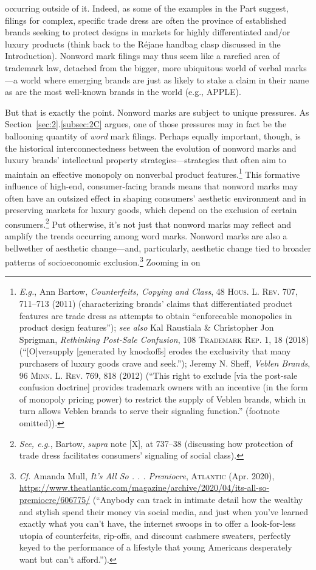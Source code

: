 \documentclass[letterpaper, 11pt, oneside]{article}
\begin{document}
occurring outside of it. Indeed, as some of the examples in the Part suggest, filings for complex, specific trade dress are often the province of established brands seeking to protect designs in markets for highly differentiated and/or luxury products (think back to the Réjane handbag clasp discussed in the Introduction). Nonword mark filings may thus seem like a rarefied area of trademark law, detached from the bigger, more ubiquitous world of verbal marks—a world where emerging brands are just as likely to stake a claim in their name as are the most well-known brands in the world (e.g., APPLE).

But that is exactly the point. Nonword marks are subject to unique pressures. As Section~\ref{sec:2}.\ref{subsec:2C} argues, one of those pressures may in fact be the ballooning quantity of \textit{word} mark filings. Perhaps equally important, though, is the historical interconnectedness between the evolution of nonword marks and luxury brands' intellectual property strategies—strategies that often aim to maintain an effective monopoly on nonverbal product features.\footnote{\textit{E.g.}, Ann Bartow, \textit{Counterfeits, Copying and Class}, 48 \textsc{Hous. L. Rev.} 707, 711–713 (2011) (characterizing brands' claims that differentiated product features are trade dress as attempts to obtain ``enforceable monopolies in product design features''); \textit{see also} Kal Raustiala \& Christopher Jon Sprigman, \textit{Rethinking Post-Sale Confusion}, 108 \textsc{Trademark Rep.} 1, 18 (2018) (``[O]versupply [generated by knockoffs] erodes the exclusivity that many purchasers of luxury goods crave and seek.''); Jeremy N. Sheff, \textit{Veblen Brands}, 96 \textsc{Minn. L. Rev.} 769, 818 (2012) (``This right to exclude [via the post-sale confusion doctrine] provides trademark owners with an incentive (in the form of monopoly pricing power) to restrict the supply of Veblen brands, which in turn allows Veblen brands to serve their signaling function.'' (footnote omitted)).} This formative influence of high-end, consumer-facing brands means that nonword marks may often have an outsized effect in shaping consumers' aesthetic environment and in preserving markets for luxury goods, which depend on the exclusion of certain consumers.\footnote{\textit{See, e.g.}, Bartow, \textit{supra} note [X], at 737–38 (discussing how protection of trade dress facilitates consumers' signaling of social class).} Put otherwise, it's not just that nonword marks may reflect and amplify the trends occurring among word marks. Nonword marks are also a bellwether of aesthetic change—and, particularly, aesthetic change tied to broader patterns of socioeconomic exclusion.\footnote{\textit{Cf.} Amanda Mull, \textit{It's All So . . . Premiocre}, \textsc{Atlantic} (Apr. 2020), \url{https://www.theatlantic.com/magazine/archive/2020/04/its-all-so-premiocre/606775/} (``Anybody can track in intimate detail how the wealthy and stylish spend their money via social media, and just when you’ve learned exactly what you can’t have, the internet swoops in to offer a look-for-less utopia of counterfeits, rip-offs, and discount cashmere sweaters, perfectly keyed to the performance of a lifestyle that young Americans desperately want but can’t afford.'').} Zooming in on 
\end{document}
